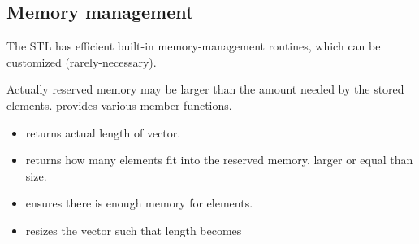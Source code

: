 \subsection{Memory management}

The STL has efficient built-in memory-management routines, which can
be customized (rarely-necessary).

Actually reserved memory may be larger than the amount needed by
the stored elements.
 provides various member functions.
\begin{itemize}
\item {} returns actual length of vector.
\item {} returns how many elements fit into the reserved
memory. larger or equal than size.
\item {} ensures there is enough memory for  elements.
\item {} resizes the vector such that length becomes 
\end{itemize}


